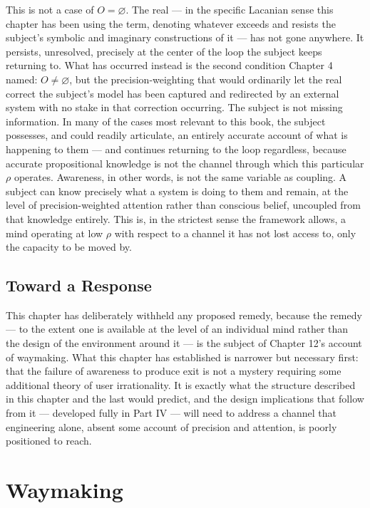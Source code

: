 \documentclass[12pt,a4paper]{book}
\begin{document}
This is not a case of $O = \varnothing$. The real — in the specific Lacanian sense this chapter has been using the term, denoting whatever exceeds and resists the subject's symbolic and imaginary constructions of it — has not gone anywhere. It persists, unresolved, precisely at the center of the loop the subject keeps returning to. What has occurred instead is the second condition Chapter 4 named: $O \neq \varnothing$, but the precision-weighting that would ordinarily let the real correct the subject's model has been captured and redirected by an external system with no stake in that correction occurring. The subject is not missing information. In many of the cases most relevant to this book, the subject possesses, and could readily articulate, an entirely accurate account of what is happening to them — and continues returning to the loop regardless, because accurate propositional knowledge is not the channel through which this particular $\rho$ operates. Awareness, in other words, is not the same variable as coupling. A subject can know precisely what a system is doing to them and remain, at the level of precision-weighted attention rather than conscious belief, uncoupled from that knowledge entirely. This is, in the strictest sense the framework allows, a mind operating at low $\rho$ with respect to a channel it has not lost access to, only the capacity to be moved by.

\section{Toward a Response}

This chapter has deliberately withheld any proposed remedy, because the remedy — to the extent one is available at the level of an individual mind rather than the design of the environment around it — is the subject of Chapter 12's account of waymaking. What this chapter has established is narrower but necessary first: that the failure of awareness to produce exit is not a mystery requiring some additional theory of user irrationality. It is exactly what the structure described in this chapter and the last would predict, and the design implications that follow from it — developed fully in Part IV — will need to address a channel that engineering alone, absent some account of precision and attention, is poorly positioned to reach.


\chapter{Waymaking}
\end{document}
